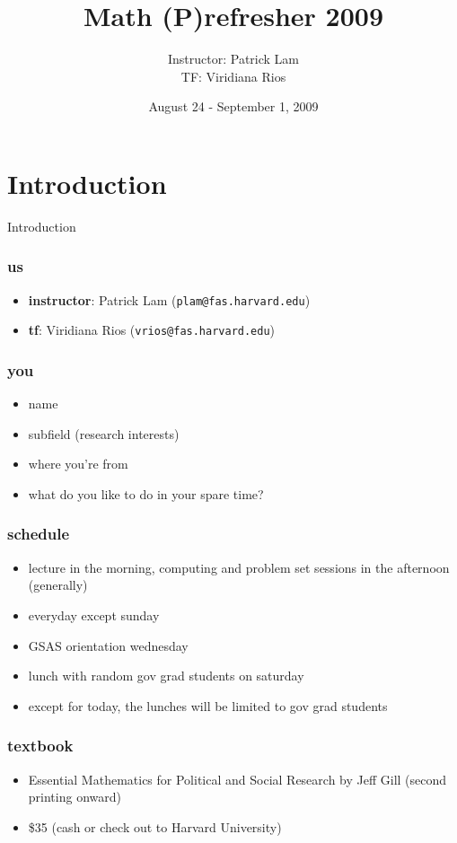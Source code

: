 \documentclass[]{beamer}
\title{Math (P)refresher 2009}
\author{Instructor: Patrick Lam\\ TF: Viridiana Rios}
\date{August 24 - September 1, 2009}
\begin{document}
\maketitle

\section{Introduction}

\begin{frame}
\begin{center}
Introduction
\end{center}
\end{frame}

\begin{frame}
\frametitle{us}
\pause
\begin{itemize}
\item \textbf{instructor}: Patrick Lam ({\tt plam@fas.harvard.edu}) 
\pause
\item \textbf{tf}: Viridiana Rios ({\tt vrios@fas.harvard.edu})
\end{itemize}
\end{frame}

\begin{frame}
\frametitle{you}
\begin{itemize}
\pause 
\item name
\item subfield (research interests)
\item where you're from
\item what do you like to do in your spare time?
\end{itemize}
\end{frame}

\begin{frame}
\frametitle{schedule}
\begin{itemize}
\item lecture in the morning, computing and problem set sessions in the afternoon (generally)
\pause
\item everyday except sunday
\pause
\item GSAS orientation wednesday
\pause
\item lunch with random gov grad students on saturday
\pause
\item except for today, the lunches will be limited to gov grad students
\end{itemize}
\end{frame}

\begin{frame}
\frametitle{textbook}
\pause
\begin{itemize}
\item Essential Mathematics for Political and Social Research by Jeff Gill (second printing onward)
\pause
\item \$35 (cash or check out to Harvard University) 
\end{itemize}
\end{frame}
\end{document}

